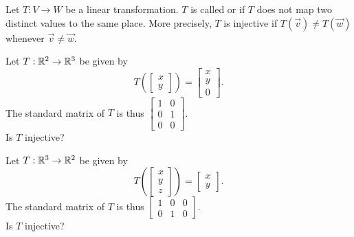 
\begin{applicationActivities}{2}{18}

\begin{definition}
Let $T: V \rightarrow W$ be a linear transformation.
$T$ is called  or  if $T$ does not map two distinct values to the same place.  More precisely, $T$ is injective if $T(\vec{v}) \neq T(\vec{w})$ whenever $\vec{v} \neq \vec{w}$.
\end{definition}

\begin{activity}{5}
Let $T: \mathbb{R}^2 \rightarrow \mathbb{R}^3$ be given by $$T\left(\begin{bmatrix}x \\ y \end{bmatrix} \right) = \begin{bmatrix} x \\ y \\ 0 \end{bmatrix}.$$
The standard matrix of $T$ is thus $\begin{bmatrix} 1 & 0 \\ 0 & 1 \\ 0 & 0 \end{bmatrix}$. \\
Is $T$ injective?
\end{activity}

\begin{activity}{5}
Let $T: \mathbb{R}^3 \rightarrow \mathbb{R}^2$ be given by $$T\left(\begin{bmatrix} x \\ y \\ z \end{bmatrix} \right) = \begin{bmatrix} x \\ y \end{bmatrix}.$$  The standard matrix of $T$ is thus $\begin{bmatrix} 1 & 0 &0  \\ 0 & 1 & 0 \end{bmatrix}$.\\
Is $T$ injective?
\end{activity}


\end{applicationActivities}

